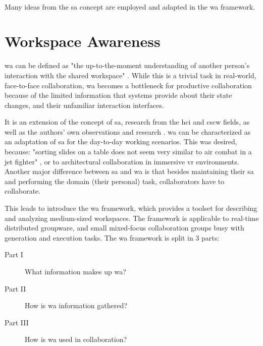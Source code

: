 \paragraph[Bridge]{}
Many ideas from the \gls{sa} concept are employed and adapted in the \gls{wa} framework.


\section{Workspace Awareness}
\gls{wa} can be defined as "the up-to-the-moment understanding of another person’s interaction with the shared workspace" \parencite{gutwin_descriptive_2002}. While this is a trivial task in real-world, face-to-face collaboration, \gls{wa} becomes a bottleneck for productive collaboration because of the limited information that systems provide about their state changes, and their unfamiliar interaction interfaces.
 
It is an extension of the concept of \gls{sa}, research from the \gls{hci} and \gls{cscw} fields, as well as the authors' own observations and research \parencite{gutwin_descriptive_2002}. \gls{wa} can be characterized as an adaptation of \gls{sa} for the day-to-day working scenarios. This was desired, because: "sorting slides on a table does not seem very similar to air combat in a jet fighter" \parencite{gutwin_descriptive_2002}, or to architectural collaboration in immersive \gls{vr} environments. Another major difference between \gls{sa} and \gls{wa} is that besides maintaining their \gls{sa} and performing the domain (their personal) task, collaborators have to collaborate.

This leads \parencite{gutwin_descriptive_2002} to introduce the \gls{wa} framework, which provides a toolset for describing and analyzing medium-sized workspaces. The framework is applicable to real-time distributed groupware, and small mixed-focus collaboration groups busy with generation and execution tasks.
The \gls{wa} framework is split in 3 parts:
\begin{description}
	\item[Part I] What information makes up \gls{wa}?
	\item[Part II] How is \gls{wa} information gathered?
	\item[Part III] How is \gls{wa} used in collaboration? 
\end{description}

